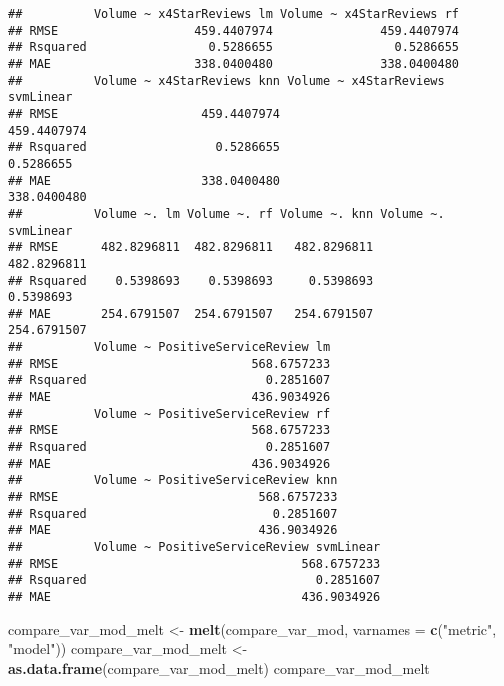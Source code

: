 \documentclass[]{article}
\newenvironment{Shaded}{\begin{snugshade}}{\end{snugshade}}
\newcommand{\KeywordTok}[1]{\textcolor[rgb]{0.13,0.29,0.53}{\textbf{#1}}}
\newcommand{\DataTypeTok}[1]{\textcolor[rgb]{0.13,0.29,0.53}{#1}}
\newcommand{\StringTok}[1]{\textcolor[rgb]{0.31,0.60,0.02}{#1}}
\newcommand{\NormalTok}[1]{#1}
\begin{document}
\begin{verbatim}
##          Volume ~ x4StarReviews lm Volume ~ x4StarReviews rf
## RMSE                   459.4407974               459.4407974
## Rsquared                 0.5286655                 0.5286655
## MAE                    338.0400480               338.0400480
##          Volume ~ x4StarReviews knn Volume ~ x4StarReviews svmLinear
## RMSE                    459.4407974                      459.4407974
## Rsquared                  0.5286655                        0.5286655
## MAE                     338.0400480                      338.0400480
##          Volume ~. lm Volume ~. rf Volume ~. knn Volume ~. svmLinear
## RMSE      482.8296811  482.8296811   482.8296811         482.8296811
## Rsquared    0.5398693    0.5398693     0.5398693           0.5398693
## MAE       254.6791507  254.6791507   254.6791507         254.6791507
##          Volume ~ PositiveServiceReview lm
## RMSE                           568.6757233
## Rsquared                         0.2851607
## MAE                            436.9034926
##          Volume ~ PositiveServiceReview rf
## RMSE                           568.6757233
## Rsquared                         0.2851607
## MAE                            436.9034926
##          Volume ~ PositiveServiceReview knn
## RMSE                            568.6757233
## Rsquared                          0.2851607
## MAE                             436.9034926
##          Volume ~ PositiveServiceReview svmLinear
## RMSE                                  568.6757233
## Rsquared                                0.2851607
## MAE                                   436.9034926
\end{verbatim}

\begin{Shaded}
\begin{Highlighting}[]
\NormalTok{compare_var_mod_melt <-}\StringTok{ }\KeywordTok{melt}\NormalTok{(compare_var_mod, }\DataTypeTok{varnames =} \KeywordTok{c}\NormalTok{(}\StringTok{"metric"}\NormalTok{, }\StringTok{"model"}\NormalTok{))}
\NormalTok{compare_var_mod_melt <-}\StringTok{ }\KeywordTok{as.data.frame}\NormalTok{(compare_var_mod_melt)}
\NormalTok{compare_var_mod_melt}
\end{Highlighting}
\end{Shaded}
\end{document}
